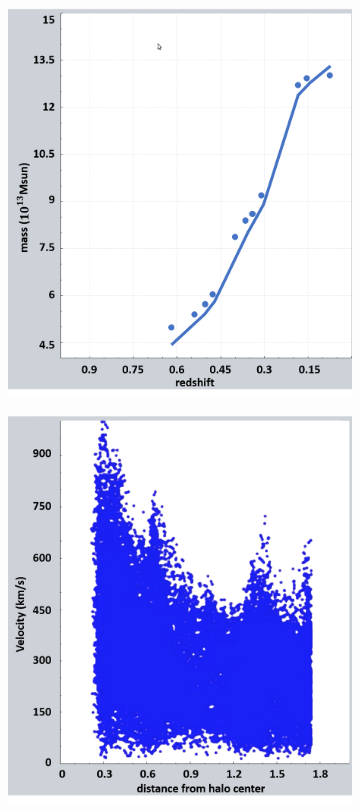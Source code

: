 \begin{figure}[t]
        \begin{subfigure}{0.5\textwidth}
        \centering
         \includegraphics[width=\textwidth]{images/darkmatter/new_plotview_left.png}
                \caption{}
                \label{fig:MPs}
        \end{subfigure}%
        \begin{subfigure}{0.5\textwidth}
        \centering                \includegraphics[width=\textwidth]{images/darkmatter/fixed_plotview_right.png}

\end{subfigure}
\end{figure}
